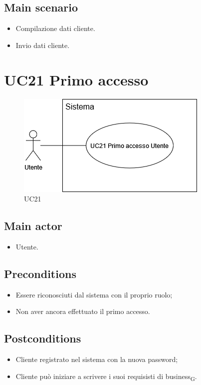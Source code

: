 \documentclass{article}
\begin{document}
    \subsection*{Main scenario}
        \begin{itemize}
            \item Compilazione dati cliente.
            \item Invio dati cliente.
        \end{itemize}
\section{UC21 Primo accesso}
 \begin{figure}[h]
          \centering
          \includegraphics[width=.8\textwidth, height=.6\textheight, keepaspectratio]{documenti/imgUML/UC21-PRIMO-ACCESSO.drawio.png}
            \caption{UC21}
          \label{fig:UC21}
        \end{figure}
\subsection*{Main actor}
        \begin{itemize}
            \item Utente.
        \end{itemize}
        
    \subsection*{Preconditions}
        \begin{itemize}
            \item Essere riconosciuti dal sistema con il proprio ruolo;
            \item Non aver ancora effettuato il primo accesso.
        \end{itemize}
        
    \subsection*{Postconditions}
        \begin{itemize}
            \item Cliente registrato nel sistema con la nuova password;
            \item Cliente può iniziare a scrivere i suoi requisisti di business\textsubscript{G}.
        \end{itemize}
\end{document}
